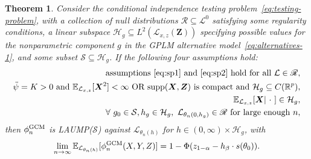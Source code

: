 \documentclass[aos]{imsart}
\theoremstyle{plain}
\newtheorem{theorem}{Theorem}
\theoremstyle{remark}
\newcommand{\E}{\mathbb E}								%
\newcommand{\R}{\mathbb{R}}								%
\newcommand{\prx}{\bm X}								%
\newcommand{\srx}{X}									%
\newcommand{\prz}{\bm Z}								%
\newcommand{\srz}{Z}									%
\newcommand{\sry}{Y}									%
\newcommand{\law}{\mathcal L}							%
\newcommand{\nulllaws}{\mathscr L^0}					%
\newcommand{\regclass}{\mathscr R}					    %
\newcommand{\GCM}{\textnormal{GCM}}						%
\renewcommand{\H}{\mathcal H}		 					%
\begin{document}
\begin{theorem} \label{thm:optimality} 
    Consider the conditional independence testing problem~\eqref{eq:testing-problem}, with a collection of null distributions $\regclass\subseteq\nulllaws$ satisfying some regularity conditions, a linear subspace $\H_g \subseteq L^2(\law_{x,z}(\bm Z))$ specifying possible values for the nonparametric component $g$ in the GPLM alternative model~\eqref{eq:alternatives-1}, and some subset $\mathcal S \subseteq \H_g$. If the following four assumptions hold:
    \begin{align}
        \text{assumptions \eqref{eq:sp1} and \eqref{eq:sp2} hold for all } \law \in \regclass, \label{eq:sp-assumptions}\\
        \ddot{\psi} = K > 0 \text{ and } \E_{\law_{x,z}}[\prx^2] < \infty \text{ OR } \mathrm{supp}(\prx, \prz) \text{ is compact and } \H_g \subseteq C(\R^p), \label{eq:moment-assumptions}\\
        \E_{\law_{x,z}}[\prx|\ \cdot \ ] \in \H_g, \label{eq:conditional-expectation} \\
        \forall\ g_0\in\mathcal{S}, h_g \in \H_g, \ \law_{\theta_n(0, h_g)} \in \regclass \text{ for large enough } n, \label{eq:interior-point}
    \end{align}
    then $\phi_n^{\GCM}$ is LAUMP($\mathcal{S}$) against $\law_{\theta_n(h)}$ for $h \in (0, \infty) \times \H_g$, with 
    \begin{equation}
        \lim_{n \rightarrow \infty}\E_{\law_{\theta_n(h)}}[\phi_n^{\GCM}(\srx, \sry, \srz)] = 1 - \Phi(z_{1-\alpha} - h_\beta \cdot s(\theta_0)).
        \label{eq:power-of-gcm-test}
    \end{equation}
\end{theorem}
\end{document}
